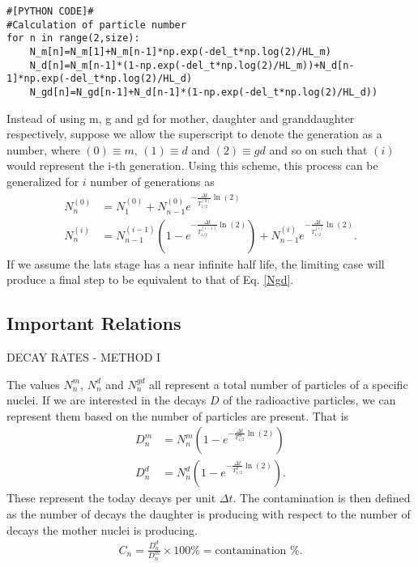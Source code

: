 \begin{lstlisting}
#[PYTHON CODE]#
#Calculation of particle number
for n in range(2,size):
	N_m[n]=N_m[1]+N_m[n-1]*np.exp(-del_t*np.log(2)/HL_m)
	N_d[n]=N_m[n-1]*(1-np.exp(-del_t*np.log(2)/HL_m))+N_d[n-1]*np.exp(-del_t*np.log(2)/HL_d)
	N_gd[n]=N_gd[n-1]+N_d[n-1]*(1-np.exp(-del_t*np.log(2)/HL_d))

\end{lstlisting}

\begin{Addition}
	Instead of using m, g and gd for mother, daughter and granddaughter respectively, suppose we allow the superscript to denote the generation as a number, where $(0) \equiv m$, $(1) \equiv d$ and $(2) \equiv gd$ and so on such that $(i)$ would represent the i-th generation. Using this scheme, this process can be generalized for $i$ number of generations as
	\begin{align}
	N^{(0)}_n &= N^{(0)}_1+N^{(0)}_{n-1}e^{-\frac{\Delta t}{T^{(0)}_{1/2}}\ln(2)} \label{N0} \\
	N^{(i)}_n &= N^{(i-1)}_{n-1}\left(1-e^{-\frac{\Delta t}{T^{(i-1)}_{1/2}}\ln(2)}\right)+N^{(i)}_{n-1}e^{-\frac{\Delta t}{T^{(i)}_{1/2}}\ln(2)}.\label{Ni} 
	\end{align}
	If we assume the lats stage has a near infinite half life, the limiting case will produce a final step to be equivalent to that of Eq. \ref{Ngd}.
\end{Addition}

\subsection{Important Relations}

\begin{center}
	DECAY RATES - METHOD I
\end{center}

The values $N^m_n$, $N^d_n$ and $N^{gd}_n$ all represent a total number of particles of a specific nuclei. If we are interested in the decays $D$ of the radioactive particles, we can represent them based on the number of particles are present. That is
\begin{align}
D^m_n &= N^m_{n}\left(1-e^{-\frac{\Delta t}{T^m_{1/2}}\ln(2)}\right) \\
D^d_n &= N^d_{n}\left(1-e^{-\frac{\Delta t}{T^d_{1/2}}\ln(2)}\right). 
\end{align}
These represent the today decays per unit $\Delta t$. The contamination is then defined as the number of decays the daughter is producing with respect to the number of decays the mother nuclei is producing.
\begin{align}
C_n=\frac{D^d_n}{D^m_n} \times 100  \%=\textrm{contamination \%}. \label{contamination}
\end{align} 

